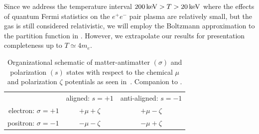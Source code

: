\label{sec:boltzmann}
\noindent Since we address the temperature interval $200\text{\,keV}>T>20\text{\,keV}$ where the effects of quantum Fermi statistics on the $e^{+}e^{-}$ pair plasma are relatively small, but the gas is still considered relativistic, we will employ the Boltzmann approximation to the partition function in . However, we extrapolate our results for presentation completeness up to $T\simeq 4m_{e}$.

\begin{table}[ht]
 \centering
 \begin{tabular}{ r|c|c| }
 \multicolumn{1}{r}{}
 & \multicolumn{1}{c}{aligned: $s=+1$}
 & \multicolumn{1}{c}{anti-aligned: $s=-1$} \\
 \cline{2-3}
 electron: $\sigma=+1$ & $+\mu+\zeta$ & $+\mu-\zeta$ \TBstrut\\
 \cline{2-3}
 positron: $\sigma=-1$ & $-\mu-\zeta$ & $-\mu+\zeta$ \TBstrut\\
 \cline{2-3}
 \end{tabular}\\\,\Bstrut\\
 \caption{Organizational schematic of matter-antimatter $(\sigma)$ and polarization $(s)$ states with respect to the chemical $\mu$ and polarization $\zeta$ potentials as seen in~. Companion to .}
 \label{fig:org}
\end{table}


